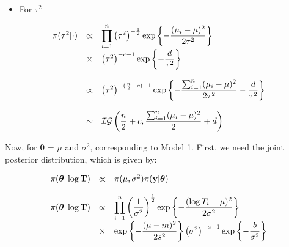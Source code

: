 \documentclass{asaproc}
\begin{document}
\begin{itemize}
\item For $\tau^2$
\end{itemize}
\begin{small}
\begin{eqnarray*}
\begin{array}{lcl ll }
\pi(\tau^2|\cdot) & \propto & \displaystyle\prod_{i=1}^{n} \left(\tau^2\right)^{-\frac{1}{2}}\mbox{exp}\left\{ -\dfrac{(\mu_i - \mu)^2}{2\tau^2}\right\}  \\
& \times &  \left(\tau^2\right)^{-c-1} \mbox{exp}\left\{ -\dfrac{d}{\tau^2}\right\}  \\ \\
& \propto & \left(\tau^2\right)^{-(\frac{n}{2}+c)-1}\mbox{exp}\left\{ -\dfrac{\sum_{i=1}^{n} (\mu_i - \mu)^2}{2\tau^2} -\dfrac{d}{\tau^2}\right\}  \\ \\
& \sim & \mathcal{IG}\left( \dfrac{n}{2}+c,  \dfrac{\sum_{i=1}^{n} (\mu_i - \mu)^2}{2} + d \right)
\end{array}
\end{eqnarray*}
\end{small}



Now, for $\boldsymbol{\theta}$ = $\mu$ and $\sigma^2$, corresponding to Model 1. First, we need the joint posterior distribution, which is given by:
\begin{small}
\begin{eqnarray*}
\begin{array}{lcl ll }
\pi(\boldsymbol{\theta}|\log\textbf{T}) & \propto & \pi(\mu, \sigma^2)\pi(\textbf{y}|\boldsymbol{\theta}) \\ \\

\pi(\boldsymbol{\theta}|\log\textbf{T}) & \propto &\displaystyle\prod_{i=1}^{n}  \left(\dfrac{1}{\sigma^2}\right)^{\frac{1}{2}}\mbox{exp}\left\{ -\dfrac{(\log T_i - \mu)^2}{2\sigma^2} \right\} \\
& \times &\mbox{exp}\left\{ -\dfrac{(\mu - m)^2}{2s^2}\right\} \left(\sigma^2\right)^{-a-1} \mbox{exp}\left\{ -\dfrac{b}{\sigma^2}\right\}  \\ \\
\end{array}
\end{eqnarray*}
\end{small}
\end{document}
